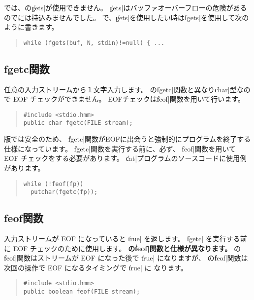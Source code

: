 \cmm では、\cl の\|gets|が使用できません。
\|gets|はバッファオーバーフローの危険があるので\cmm には持込みませんでした。
\cmm で、\|gets|を使用したい時は\|fgets|を使用して次のように書きます。

\begin{quote}
\begin{verbatim}
while (fgets(buf, N, stdin)!=null) { ...
\end{verbatim}
\end{quote}


\subsection{fgetc関数}

任意の入力ストリームから１文字入力します。
\cl の\|fgetc|関数と異なり\|char|型なので EOF チェックができません。
EOFチェックは\|feof|関数を用いて行います。

\begin{quote}
\begin{verbatim}
#include <stdio.hmm>
public char fgetc(FILE stream);
\end{verbatim}
\end{quote}

\tac 版では安全のため、
\|fgetc|関数がEOFに出会うと強制的にプログラムを終了する仕様になっています。
\|fgetc|関数を実行する前に、必ず、
\|feof|関数を用いて EOF チェックをする必要があります。
\|cat|プログラムのソースコードに使用例があります。

\begin{quote}
\begin{verbatim}
while (!feof(fp))
  putchar(fgetc(fp));
\end{verbatim}
\end{quote}

\subsection{feof関数}

入力ストリームが EOF になっていると \|true| を返します。
\|fgetc| を実行する前に EOF チェックのために使用します。
{\bf \cl の\|feof|関数と仕様が異なります。}
\cl の\|feof|関数はストリームが EOF になった後で \|true| になりますが、
\cmml の\|feof|関数は次回の操作で EOF になるタイミングで \|true| に
なります。

\begin{quote}
\begin{verbatim}
#include <stdio.hmm>
public boolean feof(FILE stream);
\end{verbatim}
\end{quote}

